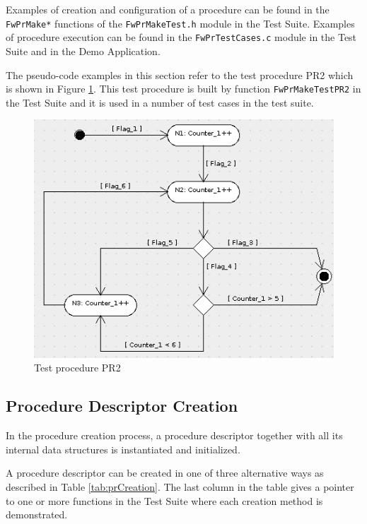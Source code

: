 \documentclass[a4paper,10pt]{article}
\begin{document}
Examples of creation and configuration of a procedure can be found in the \texttt{FwPrMake*} functions of 
the \texttt{FwPrMakeTest.h} module in the Test Suite. Examples of procedure execution can be found in the 
\texttt{FwPrTestCases.c} module in the Test Suite and in the Demo Application.

The pseudo-code examples in this section refer to the test procedure PR2 which is shown in Figure \ref{fig:PR2}. 
This test procedure is built by function \texttt{FwPrMakeTestPR2} in the Test 
Suite and it is used in a number of test cases in the test suite.

\begin{figure}[ht]
 \centering
 \includegraphics[scale=0.52,keepaspectratio=true]{../images/PR2.png}
 \caption{Test procedure PR2}
 \label{fig:PR2}
\end{figure}

\newpage

\subsection{Procedure Descriptor Creation} 
In the procedure creation process, a procedure descriptor together with all its internal data 
structures is instantiated and initialized.

A procedure descriptor can be created in one of three alternative ways as described in Table \ref{tab:prCreation}. 
The last column in the table gives a pointer to one or more functions in the Test Suite where each creation 
method is demonstrated.
\end{document}

